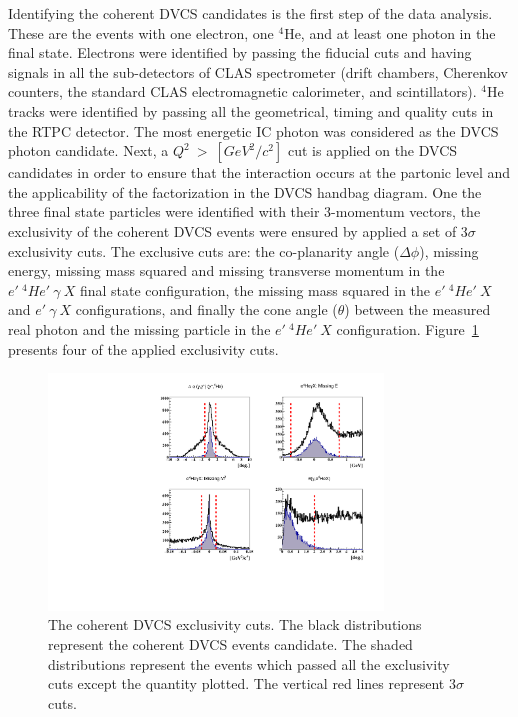 \documentclass[nofootinbib,twocolumn,showpacs,prl,superscriptaddress,secnumarabic,amssymb,nobibnotes,aps,floatfix]{revtex4}
\begin{document}
Identifying the coherent DVCS candidates is the first step of the data 
analysis. These are the events with one electron, one $^4$He, and at least one 
photon in the final state. Electrons were identified by passing the fiducial 
cuts and having signals in all the sub-detectors of CLAS spectrometer (drift 
chambers, Cherenkov counters, the standard CLAS electromagnetic calorimeter, 
and scintillators). $^4$He tracks were identified by passing all the 
geometrical, timing and quality cuts in the RTPC detector. The most energetic 
IC photon was considered as the DVCS photon candidate. Next, a 
$Q^{2}~>~[GeV^{2}/c^{2}]$ cut is applied on the DVCS candidates in order to 
ensure that the interaction occurs at the partonic level and the applicability
of the factorization in the DVCS handbag diagram. One the three final state 
particles were identified with their 3-momentum vectors, the exclusivity of the 
coherent DVCS events were ensured by applied a set of 3$\sigma$ exclusivity 
cuts. The exclusive cuts are: the co-planarity angle ($\Delta \phi$), missing 
energy, missing mass squared and missing transverse momentum in the 
$e'~^4He'~\gamma~X$ final state configuration, the missing mass squared in the 
$e'~^4He'~X$ and $e'~\gamma~X$ configurations, and finally the cone angle 
($\theta$) between the measured real photon and the missing particle in the 
$e'~^4He'~X$ configuration. Figure~\ref{fig:kin-cuts} presents four of the 
applied exclusivity cuts.

\begin{figure}[tb]
\includegraphics[width=8.9cm]{figs/coh_exc_cuts.pdf}
\caption{ The coherent DVCS exclusivity cuts. The black
distributions represent the coherent DVCS events candidate. The shaded
distributions represent the events which passed all the exclusivity cuts
except the quantity plotted. The vertical red lines represent $3\sigma$ cuts.}
\label{fig:kin-cuts}
\end{figure}
\end{document}
